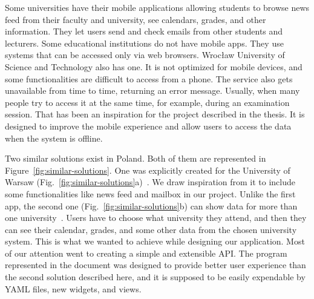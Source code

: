 Some universities have their mobile applications allowing students to browse news feed from their faculty and university, see calendars, grades, and other information. They let users send and check emails from other students and lecturers. Some educational institutions do not have mobile apps. They use systems that can be accessed only via web browsers. Wrocław University of Science and Technology also has one. It is not optimized for mobile devices, and some functionalities are difficult to access from a phone. The service also gets unavailable from time to time, returning an error message. Usually, when many people try to access it at the same time, for example, during an examination session. That has been an inspiration for the project described in the thesis. It is designed to improve the mobile experience and allow users to access the data when the system is offline.

Two similar solutions exist in Poland. Both of them are represented in Figure~\ref{fig:similar-solutions}. One was explicitly created for the University of Warsaw (Fig.~\ref{fig:similar-solutions}a)~\cite{mobilny-usos}. We draw inspiration from it to include some functionalities like news feed and mailbox in our project. Unlike the first app, the second one (Fig.~\ref{fig:similar-solutions}b) can show data for more than one university~\cite{kiedy-wyklad}. Users have to choose what university they attend, and then they can see their calendar, grades, and some other data from the chosen university system. This is what we wanted to achieve while designing our application. Most of our attention went to creating a simple and extensible API. The program represented in the document was designed to provide better user experience than the second solution described here, and it is supposed to be easily expendable by YAML files, new widgets, and views.

